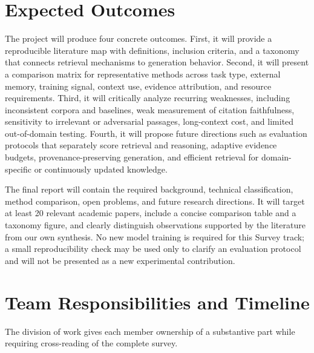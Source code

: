 \documentclass[10.5pt,compsoc]{CjC}
\begin{document}
\section{Expected Outcomes}

The project will produce four concrete outcomes. First, it will provide a reproducible literature map with definitions, inclusion criteria, and a taxonomy that connects retrieval mechanisms to generation behavior. Second, it will present a comparison matrix for representative methods across task type, external memory, training signal, context use, evidence attribution, and resource requirements. Third, it will critically analyze recurring weaknesses, including inconsistent corpora and baselines, weak measurement of citation faithfulness, sensitivity to irrelevant or adversarial passages, long-context cost, and limited out-of-domain testing. Fourth, it will propose future directions such as evaluation protocols that separately score retrieval and reasoning, adaptive evidence budgets, provenance-preserving generation, and efficient retrieval for domain-specific or continuously updated knowledge.

The final report will contain the required background, technical classification, method comparison, open problems, and future research directions. It will target at least 20 relevant academic papers, include a concise comparison table and a taxonomy figure, and clearly distinguish observations supported by the literature from our own synthesis. No new model training is required for this Survey track; a small reproducibility check may be used only to clarify an evaluation protocol and will not be presented as a new experimental contribution.

\section{Team Responsibilities and Timeline}

The division of work gives each member ownership of a substantive part while requiring cross-reading of the complete survey.
\end{document}
